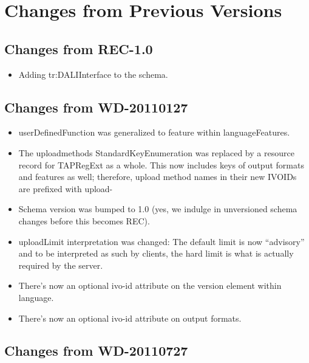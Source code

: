 \documentclass{ivoa}
\begin{document}

\section{Changes from Previous Versions}

\label{changes}

\subsection{Changes from REC-1.0}

\begin{itemize}
\item Adding tr:DALIInterface to the schema.
\end{itemize}

\subsection{Changes from WD-20110127}

\label{changes-20110127}

\begin{itemize}

\item userDefinedFunction was generalized to feature within languageFeatures.{}

\item The uploadmethods StandardKeyEnumeration was replaced by a
resource record for TAPRegExt as a whole.  This now includes keys of output
formats and features as well; therefore, upload method names in their new
IVOIDs are prefixed with upload-{}

\item Schema version was bumped to 1.0 (yes, we indulge in unversioned
schema changes before this becomes REC).{}

\item uploadLimit interpretation was changed: The default limit is now
``advisory'' and to be interpreted as such by clients, the hard limit
is what is actually required by the server.{}

\item There's now an optional ivo-id attribute on the version element
within language.{}

\item There's now an optional ivo-id attribute on output formats.{}

\end{itemize}

\subsection{Changes from WD-20110727}
\end{document}
